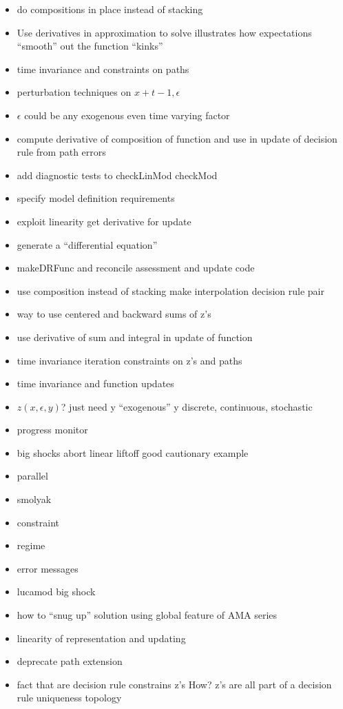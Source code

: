 \documentclass[12pt]{article}
\begin{document}
\begin{itemize}
\item do compositions in place instead of stacking
\item Use derivatives in approximation to solve illustrates how expectations ``smooth'' out the function ``kinks''
\item time invariance and constraints on paths
\item perturbation techniques on $x+{t-1}, \epsilon$
\item $\epsilon$ could be any exogenous even time varying factor
\item compute derivative of composition of function and use in update of decision rule from path errors
\item add diagnostic tests to checkLinMod checkMod
\item specify model definition requirements 
\item exploit linearity get derivative for update
\item generate a ``differential equation''
\item makeDRFunc and reconcile assessment and update code
\item use composition instead of stacking make interpolation decision rule pair
\item way to use centered and backward sums of z's
\item use derivative of sum and integral in update of function
\item time invariance iteration constraints on z's and paths
\item time invariance and function updates
\item $z(x,\epsilon,y)$? just need y ``exogenous''  y discrete, continuous, stochastic
\item progress monitor
\item big shocks abort linear liftoff good cautionary example
\item parallel
\item smolyak
\item constraint
\item regime
\item error messages
\item lucamod big shock
\item how to ``snug up'' solution using global feature of AMA series
\item linearity of representation and updating
\item deprecate path extension
\item fact that are decision rule constrains z's How? z's are all part of a decision rule uniqueness topology

\end{itemize}
\end{document}
